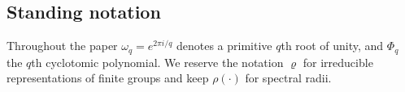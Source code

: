 \subsection{Standing notation}

Throughout the paper \(\omega_q=e^{2\pi i/q}\) denotes a primitive
\(q\)th root of unity, and \(\Phi_q\) the \(q\)th cyclotomic
polynomial. We reserve the notation \(\varrho\) for irreducible
representations of finite groups and keep \(\rho(\cdot)\) for spectral
radii.
